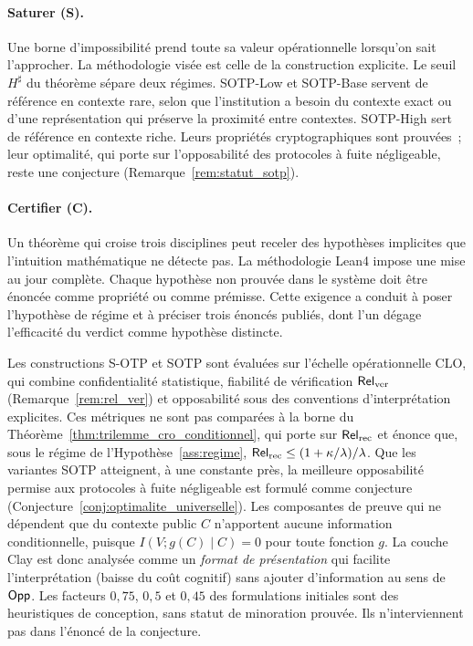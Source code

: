 \begin{sloppypar}
\paragraph{Saturer (\textbf{S}).}
Une borne d'impossibilit\'e prend toute sa valeur op\'erationnelle
lorsqu'on sait l'approcher. La m\'ethodologie vis\'ee est celle de la
construction explicite. Le seuil $H^\sharp$ du th\'eor\`eme s\'epare deux r\'egimes. SOTP-Low et
SOTP-Base servent de r\'ef\'erence en contexte rare, selon que l'institution a besoin du contexte exact
ou d'une repr\'esentation qui pr\'eserve la proximit\'e entre contextes. SOTP-High sert de r\'ef\'erence
en contexte riche. Leurs propri\'et\'es cryptographiques sont prouv\'ees~; leur optimalit\'e, qui porte sur
l'opposabilit\'e des protocoles \`a fuite n\'egligeable, reste une conjecture
(Remarque~\ref{rem:statut_sotp}).

\paragraph{Certifier (\textbf{C}).}
Un th\'eor\`eme qui croise trois disciplines peut receler des hypoth\`eses
implicites que l'intuition math\'ematique ne d\'etecte pas. La
m\'ethodologie Lean4 impose une mise au jour compl\`ete. Chaque
hypoth\`ese non prouv\'ee dans le syst\`eme doit \^etre \'enonc\'ee
comme propri\'et\'e ou comme pr\'emisse. Cette exigence a conduit \`a
poser l'hypoth\`ese de r\'egime et \`a pr\'eciser trois \'enonc\'es
publi\'es, dont l'un d\'egage l'efficacit\'e du verdict comme hypoth\`ese distincte.

\begin{remark}\label{rem:statut_sotp}
Les constructions S-OTP et SOTP sont \'evalu\'ees sur l'\'echelle
op\'erationnelle CLO, qui combine confidentialit\'e statistique, fiabilit\'e de
v\'erification $\mathsf{Rel}_{\mathrm{ver}}$ (Remarque~\ref{rem:rel_ver}) et opposabilit\'e
sous des conventions d'interpr\'etation explicites. Ces m\'etriques ne sont
pas compar\'ees \`a la borne du Th\'eor\`eme~\ref{thm:trilemme_cro_conditionnel},
qui porte sur $\mathsf{Rel}_{\mathrm{rec}}$ et \'enonce que, sous le r\'egime de
l'Hypoth\`ese~\ref{ass:regime}, $\mathsf{Rel}_{\mathrm{rec}} \leq (1+\kappa/\lambda)/\lambda$.
Que les variantes SOTP atteignent, \`a une constante pr\`es, la meilleure opposabilit\'e
permise aux protocoles \`a fuite n\'egligeable est formul\'e comme conjecture
(Conjecture~\ref{conj:optimalite_universelle}).
Les composantes de preuve qui ne d\'ependent que du contexte public $C$
n'apportent aucune information conditionnelle, puisque
$I(V; g(C) \mid C) = 0$ pour toute fonction $g$. La couche Clay est
donc analys\'ee comme un \emph{format de pr\'esentation} qui facilite
l'interpr\'etation (baisse du co\^ut cognitif) sans ajouter
d'information au sens de $\mathsf{Opp}$. Les facteurs $0{,}75$, $0{,}5$ et $0{,}45$ des
formulations initiales sont des heuristiques de conception, sans statut de minoration prouv\'ee.
Ils n'interviennent pas dans l'\'enonc\'e de la conjecture.
\end{remark}
\end{sloppypar}
